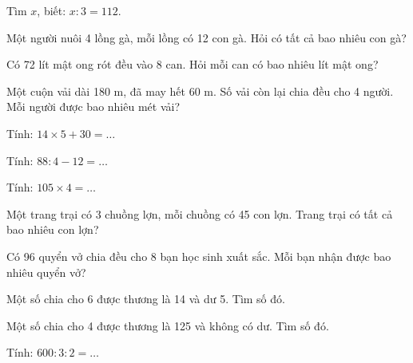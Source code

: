 \begin{ex}
Tìm $x$, biết: $x : 3 = 112$.
\end{ex}

\begin{ex}
Một người nuôi 4 lồng gà, mỗi lồng có 12 con gà. Hỏi có tất cả bao nhiêu con gà?
\end{ex}

\begin{ex}
Có 72 lít mật ong rót đều vào 8 can. Hỏi mỗi can có bao nhiêu lít mật ong?
\end{ex}

\begin{ex}
Một cuộn vải dài 180 m, đã may hết 60 m. Số vải còn lại chia đều cho 4 người. Mỗi người được bao nhiêu mét vải?
\end{ex}

\begin{ex}
Tính: $14 \times 5 + 30 = \dots$
\end{ex}

\begin{ex}
Tính: $88 : 4 - 12 = \dots$
\end{ex}

\begin{ex}
Tính: $105 \times 4 = \dots$
\end{ex}

\begin{ex}
Một trang trại có 3 chuồng lợn, mỗi chuồng có 45 con lợn. Trang trại có tất cả bao nhiêu con lợn?
\end{ex}

\begin{ex}
Có 96 quyển vở chia đều cho 8 bạn học sinh xuất sắc. Mỗi bạn nhận được bao nhiêu quyển vở?
\end{ex}

\begin{ex}
Một số chia cho 6 được thương là 14 và dư 5. Tìm số đó.
\end{ex}

\begin{ex}
Một số chia cho 4 được thương là 125 và không có dư. Tìm số đó.
\end{ex}

\begin{ex}
Tính: $600 : 3 : 2 = \dots$
\end{ex}
